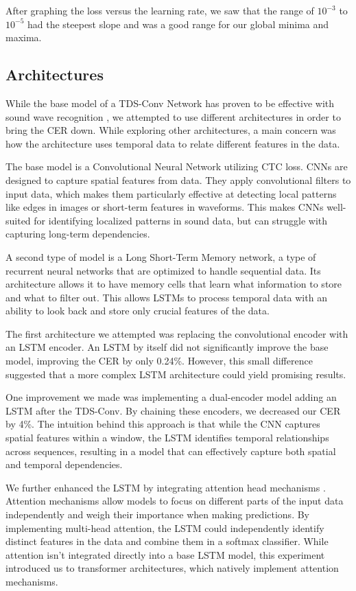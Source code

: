 \documentclass{article}
\begin{document}
After graphing the loss versus the learning rate, we saw that the range of $10^{-3}$ to $10^{-5}$ had the steepest slope and was a good range for our global minima and maxima.

\subsection{Architectures}

While the base model of a TDS-Conv Network has proven to be effective with sound wave recognition \citet{hannun}, we attempted to use different architectures in order to bring the CER down. While exploring other architectures, a main concern was how the architecture uses temporal data to relate different features in the data. 

The base model is a Convolutional Neural Network utilizing CTC loss. CNNs are designed to capture spatial features from data. They apply convolutional filters to input data, which makes them particularly effective at detecting local patterns like edges in images or short-term features in waveforms. This makes CNNs well-suited for identifying localized patterns in sound data, but can struggle with capturing long-term dependencies.

A second type of model is a Long Short-Term Memory network, a type of recurrent neural networks that are optimized to handle sequential data. Its architecture allows it to have memory cells that learn what information to store and what to filter out. This allows LSTMs to process temporal data with an ability to look back and store only crucial features of the data. 

The first architecture we attempted was replacing the convolutional encoder with an LSTM encoder. An LSTM by itself did not significantly improve the base model, improving the CER by only 0.24\%. However, this small difference suggested that a more complex LSTM architecture could yield promising results.

One improvement we made was implementing a dual-encoder model adding an LSTM after the TDS-Conv. By chaining these encoders, we decreased our CER by 4\%. The intuition behind this approach is that while the CNN captures spatial features within a window, the LSTM identifies temporal relationships across sequences, resulting in a model that can effectively capture both spatial and temporal dependencies.

We further enhanced the LSTM by integrating attention head mechanisms \citet{zhao}. Attention mechanisms allow models to focus on different parts of the input data independently and weigh their importance when making predictions. By implementing multi-head attention, the LSTM could independently identify distinct features in the data and combine them in a softmax classifier. While attention isn’t integrated directly into a base LSTM model, this experiment introduced us to transformer architectures, which natively implement attention mechanisms.
\end{document}
